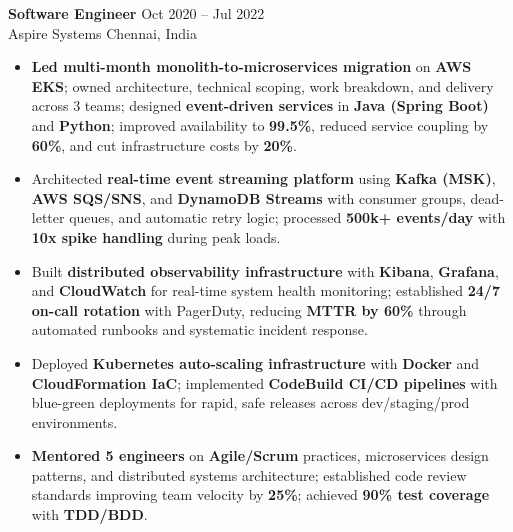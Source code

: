 \documentclass[letterpaper,10pt]{article}
\newcommand{\resumeItem}[1]{\item\small #1}
\newcommand{\resumeSubheading}[4]{
  \vspace{6pt}
  \noindent
  \textbf{#1} \hfill {\footnotesize #2} \\
  [-1pt]
  \noindent
  \small #3 \hfill {\small #4}
  \vspace{3pt}
}
\newcommand{\resumeItemsStart}{\vspace{-2pt}\begin{itemize}}
\newcommand{\resumeItemsEnd}{\end{itemize}\vspace{6pt}}
\begin{document}
\resumeSubheading
{Software Engineer}{Oct 2020 -- Jul 2022}
{Aspire Systems}{Chennai, India}
\resumeItemsStart
\resumeItem{\textbf{Led multi-month monolith-to-microservices migration} on \textbf{AWS EKS}; owned architecture, technical scoping, work breakdown, and delivery across 3 teams; designed \textbf{event-driven services} in \textbf{Java (Spring Boot)} and \textbf{Python}; improved availability to \textbf{99.5\%}, reduced service coupling by \textbf{60\%}, and cut infrastructure costs by \textbf{20\%}.}
\resumeItem{Architected \textbf{real-time event streaming platform} using \textbf{Kafka (MSK)}, \textbf{AWS SQS/SNS}, and \textbf{DynamoDB Streams} with consumer groups, dead-letter queues, and automatic retry logic; processed \textbf{500k+ events/day} with \textbf{10x spike handling} during peak loads.}
\resumeItem{Built \textbf{distributed observability infrastructure} with \textbf{Kibana}, \textbf{Grafana}, and \textbf{CloudWatch} for real-time system health monitoring; established \textbf{24/7 on-call rotation} with PagerDuty, reducing \textbf{MTTR by 60\%} through automated runbooks and systematic incident response.}
\resumeItem{Deployed \textbf{Kubernetes auto-scaling infrastructure} with \textbf{Docker} and \textbf{CloudFormation IaC}; implemented \textbf{CodeBuild CI/CD pipelines} with blue-green deployments for rapid, safe releases across dev/staging/prod environments.}
\resumeItem{\textbf{Mentored 5 engineers} on \textbf{Agile/Scrum} practices, microservices design patterns, and distributed systems architecture; established code review standards improving team velocity by \textbf{25\%}; achieved \textbf{90\% test coverage} with \textbf{TDD/BDD}.}
\resumeItemsEnd
\vspace{-6pt}

\end{document}
